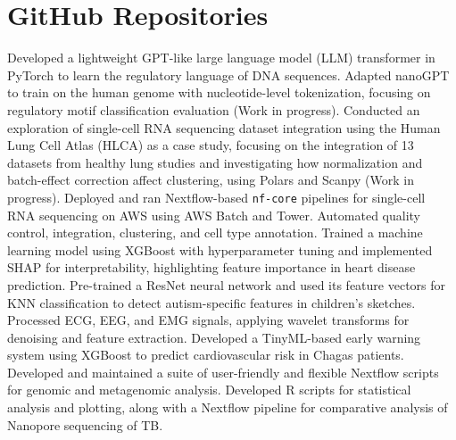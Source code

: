 \documentclass[11pt,a4paper,sans]{moderncv}
\begin{document}
\section{GitHub Repositories}
    {Developed a lightweight GPT-like large language model (LLM) transformer in PyTorch to learn the regulatory language of DNA sequences. Adapted nanoGPT to train on the human genome with nucleotide-level tokenization, focusing on regulatory motif classification evaluation (Work in progress).}{}{}
    {}
    {Conducted an exploration of single-cell RNA sequencing dataset integration using the Human Lung Cell Atlas (HLCA) as a case study, focusing on the integration of 13 datasets from healthy lung studies and investigating how normalization and batch-effect correction affect clustering, using Polars and Scanpy (Work in progress).}{}{}
    {}
    {Deployed and ran Nextflow-based \texttt{nf-core} pipelines for single-cell RNA sequencing on AWS using AWS Batch and Tower. Automated quality control, integration, clustering, and cell type annotation.}{}{}
    {}
    {Trained a machine learning model using XGBoost with hyperparameter tuning and implemented SHAP for interpretability, highlighting feature importance in heart disease prediction.}{}{}
    {}  
    {Pre-trained a ResNet neural network and used its feature vectors for KNN classification to detect autism-specific features in children's sketches.}{}{}
    {}
    {Processed ECG, EEG, and EMG signals, applying wavelet transforms for denoising and feature extraction. Developed a TinyML-based early warning system using XGBoost to predict cardiovascular risk in Chagas patients.}{}{}
    {}
    {Developed and maintained a suite of user-friendly and flexible Nextflow scripts for genomic and metagenomic analysis.}{}{}
    {}
    {Developed R scripts for statistical analysis and plotting, along with a Nextflow pipeline for comparative analysis of Nanopore sequencing of TB.}{}{}
    {}
\end{document}
